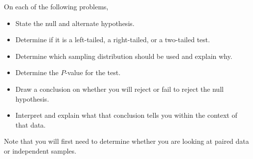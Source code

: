 On each of the following problems,
	\begin{itemize}
	\item State the null and alternate hypothesis.
	\item Determine if it is a left-tailed, a right-tailed, or a two-tailed test.
	\item Determine which sampling distribution should be used and explain why.
	\item Determine the $P$-value for the test.
	\item Draw a conclusion on whether you will reject or fail to reject the null hypothesis.
	\item Interpret and explain what that conclusion tells you within the context of that data.
	\end{itemize}
Note that you will first need to determine whether you are looking at paired data or independent samples.


